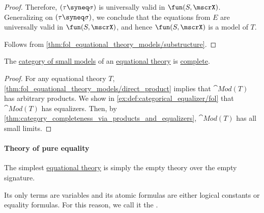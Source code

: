 \begin{proof}
  Therefore, \( (\tau \syneq \sigma) \) is universally valid in \( \fun(S, \mscrX) \). Generalizing on \( (\tau \syneq \sigma) \), we conclude that the equations from \( E \) are universally valid in \( \fun(S, \mscrX) \), and hence \( \fun(S, \mscrX) \) is a model of \( T \).

   Follows from \cref{thm:fol_equational_theory_models/substructure}.
\end{proof}

\begin{proposition}\label{thm:fol_equational_category_of_models_is_complete}
  The \hyperref[def:fol_theory_model_functor/obj]{category of small models} of an \hyperref[def:fol_equational_theory]{equational theory} is \hyperref[def:complete_category]{complete}.
\end{proposition}
\begin{proof}
  For any equational theory \( T \), \cref{thm:fol_equational_theory_models/direct_product} implies that \( \cat{Mod}(T) \) has arbitrary products. We show in \cref{ex:def:categorical_equalizer/fol} that \( \cat{Mod}(T) \) has equalizers. Then, by \cref{thm:category_completeness_via_products_and_equalizers}, \( \cat{Mod}(T) \) has all small limits.
\end{proof}

\paragraph{Theory of pure equality}

\begin{definition}\label{def:pure_equality}\mimprovised
  The simplest \hyperref[def:fol_equational_theory]{equational theory} is simply the empty theory over the empty signature.

  Its only terms are variables and its atomic formulas are either logical constants or equality formulas. For this reason, we call it the .
\end{definition}

